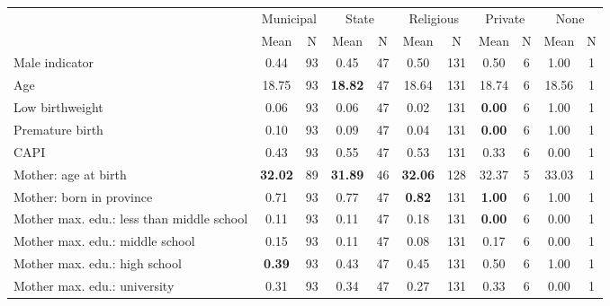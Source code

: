 \begin{tabular}{l c c c c c c c c c c}
\toprule
& \multicolumn{2}{c}{Municipal} & \multicolumn{2}{c}{State} & \multicolumn{2}{c}{Religious} & \multicolumn{2}{c}{Private} & \multicolumn{2}{c}{None} \\
& \scriptsize Mean & \scriptsize N & \scriptsize Mean & \scriptsize N & \scriptsize Mean & \scriptsize N & \scriptsize Mean & \scriptsize N & \scriptsize Mean & \scriptsize N \\
\midrule
Male indicator &      0.44 &        93 &      0.45 &        47 &      0.50 &       131 &      0.50 &         6 &      1.00 &         1 \\
Age &     18.75 &        93 & \textbf{    18.82} &        47 &     18.64 &       131 &     18.74 &         6 &     18.56 &         1 \\
Low birthweight &      0.06 &        93 &      0.06 &        47 &      0.02 &       131 & \textbf{     0.00} &         6 &      1.00 &         1 \\
Premature birth &      0.10 &        93 &      0.09 &        47 &      0.04 &       131 & \textbf{     0.00} &         6 &      1.00 &         1 \\
CAPI &      0.43 &        93 &      0.55 &        47 &      0.53 &       131 &      0.33 &         6 &      0.00 &         1 \\
Mother: age at birth & \textbf{    32.02} &        89 & \textbf{    31.89} &        46 & \textbf{    32.06} &       128 &     32.37 &         5 &     33.03 &         1 \\
Mother: born in province &      0.71 &        93 &      0.77 &        47 & \textbf{     0.82} &       131 & \textbf{     1.00} &         6 &      1.00 &         1 \\
Mother max. edu.: less than middle school &      0.11 &        93 &      0.11 &        47 &      0.18 &       131 & \textbf{     0.00} &         6 &      0.00 &         1 \\
Mother max. edu.: middle school &      0.15 &        93 &      0.11 &        47 &      0.08 &       131 &      0.17 &         6 &      0.00 &         1 \\
Mother max. edu.: high school & \textbf{     0.39} &        93 &      0.43 &        47 &      0.45 &       131 &      0.50 &         6 &      1.00 &         1 \\
Mother max. edu.: university &      0.31 &        93 &      0.34 &        47 &      0.27 &       131 &      0.33 &         6 &      0.00 &         1 \\

\end{tabular}
